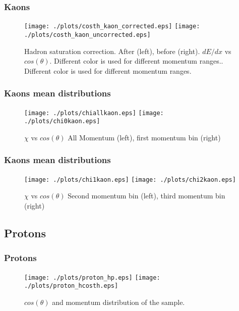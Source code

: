 \documentclass{beamer}
\begin{document}
\begin{frame}\frametitle{Kaons}
\begin{figure}
\texttt{[image: ./plots/costh\_kaon\_corrected.eps]} 
\texttt{[image: ./plots/costh\_kaon\_uncorrected.eps]} 
\caption{Hadron saturation correction. After (left), before (right). $dE/dx$ vs $cos(\theta)$. Different color is used for different momentum ranges.. Different color is used for different momentum ranges.}
\end{figure}
\end{frame}

\begin{frame}\frametitle{Kaons mean distributions}
\begin{figure}[!htp]
\centering
\texttt{[image: ./plots/chiallkaon.eps]}
\texttt{[image: ./plots/chi0kaon.eps]}
\caption{$\chi$ vs $cos(\theta)$ All Momentum (left), first momentum bin (right)}
\end{figure}
\end{frame}

\begin{frame}\frametitle{Kaons mean distributions}
\begin{figure}[!htp]
\centering
\texttt{[image: ./plots/chi1kaon.eps]}
\texttt{[image: ./plots/chi2kaon.eps]}
\caption{$\chi$ vs $cos(\theta)$ Second momentum bin (left), third momentum bin (right)}
\end{figure}
\end{frame}

\subsection{Protons}
\begin{frame}\frametitle{Protons}
\begin{figure}
\texttt{[image: ./plots/proton\_hp.eps]} 
\texttt{[image: ./plots/proton\_hcosth.eps]} 
\caption{$cos(\theta)$ and momentum distribution of the sample.}
\end{figure}
\end{frame}
\end{document}
